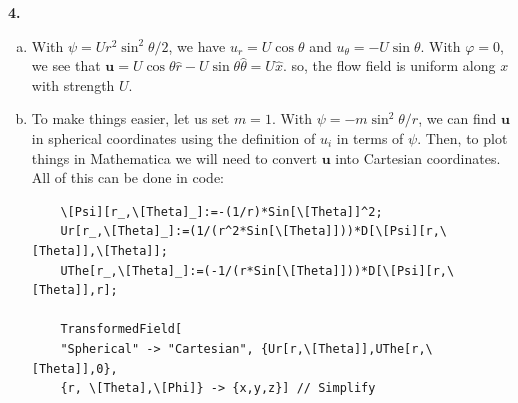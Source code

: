 \documentclass[11pt]{article}
\begin{document}
\noindent \textbf{4.} 
\begin{enumerate}[(a)]
	\item With $\psi = Ur^2\sin^2\theta/2$, we have $u_r = U\cos\theta$ and $u_\theta = -U\sin\theta$. With $\varphi = 0$, we see that 	
	$\mathbf{u} = U\cos\theta \hat{r} - U\sin\theta \hat{\theta} = U \hat{x}$. so, the flow field is uniform along $x$ with strength $U$. 
	
	
	\item To make things easier, let us set $m=1$. With $\psi = -m\sin^2\theta/r$, we can find $\mathbf{u}$ in spherical coordinates using the definition of $u_i$ in terms of $\psi$. Then, to plot things in Mathematica we will need to convert $\mathbf{u}$ into Cartesian coordinates. All of this can be done in code:
	\begin{lstlisting}
	\[Psi][r_,\[Theta]_]:=-(1/r)*Sin[\[Theta]]^2;
	Ur[r_,\[Theta]_]:=(1/(r^2*Sin[\[Theta]]))*D[\[Psi][r,\[Theta]],\[Theta]];
	UThe[r_,\[Theta]_]:=(-1/(r*Sin[\[Theta]]))*D[\[Psi][r,\[Theta]],r];
	
	TransformedField[ 
	"Spherical" -> "Cartesian", {Ur[r,\[Theta]],UThe[r,\[Theta]],0},  
	{r, \[Theta],\[Phi]} -> {x,y,z}] // Simplify
	\end{lstlisting}
	

\end{enumerate}
\end{document}
